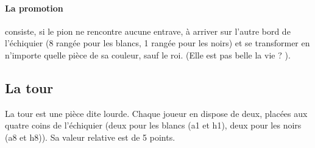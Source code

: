 \documentclass[a5paper,openany,twocolumn]{book}%
\begin{document}
\paragraph*{La promotion} consiste, si le pion ne rencontre aucune entrave, à arriver sur l'autre bord de l'échiquier (8 rangée pour les blancs, 1 rangée pour les noirs) et se transformer en n'importe quelle pièce de sa couleur, sauf le roi. (Elle est pas belle la vie ? \smiley{}). 
%
%
%
%
%
%
%
%
%
%
%

\subsection{La tour}


La tour est une pièce dite lourde. Chaque joueur en dispose de deux, placées aux quatre coins de l'échiquier (deux pour les blancs (a1 et h1), deux pour les noirs (a8 et h8)). Sa valeur relative est de 5 points.
\end{document}
